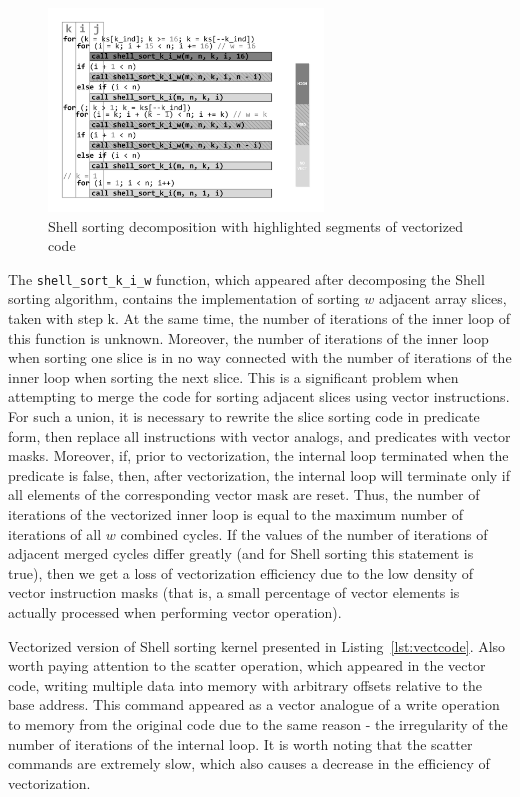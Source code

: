 \documentclass[
11pt,%
tightenlines,%
twoside,%
onecolumn,%
nofloats,%
nobibnotes,%
nofootinbib,%
superscriptaddress,%
noshowpacs,%
centertags]%
{revtex4}
\begin{document}
\begin{figure}[h]
\setcaptionmargin{5mm}
\onelinecaptionsfalse
\includegraphics[width=0.65\textwidth]{pics/pic_decomposition.pdf}
\caption{Shell sorting decomposition with highlighted segments of vectorized code}\label{pic:decompos}
\end{figure}

The \texttt{shell\_sort\_k\_i\_w} function, which appeared after decomposing the Shell sorting algorithm, contains the implementation of sorting $ w $ adjacent array slices, taken with step k. 
At the same time, the number of iterations of the inner loop of this function is unknown.
Moreover, the number of iterations of the inner loop when sorting one slice is in no way connected with the number of iterations of the inner loop when sorting the next slice.
This is a significant problem when attempting to merge the code for sorting adjacent slices using vector instructions.
For such a union, it is necessary to rewrite the slice sorting code in predicate form, then replace all instructions with vector analogs, and predicates with vector masks.
Moreover, if, prior to vectorization, the internal loop terminated when the predicate is false, then, after vectorization, the internal loop will terminate only if all elements of the corresponding vector mask are reset.
Thus, the number of iterations of the vectorized inner loop is equal to the maximum number of iterations of all $ w $ combined cycles.
If the values of the number of iterations of adjacent merged cycles differ greatly (and for Shell sorting this statement is true), then we get a loss of vectorization efficiency due to the low density of vector instruction masks (that is, a small percentage of vector elements is actually processed when performing vector operation).

Vectorized version of Shell sorting kernel presented in Listing~\ref{lst:vectcode}.
Also worth paying attention to the scatter operation, which appeared in the vector code, writing multiple data into memory with arbitrary offsets relative to the base address.
This command appeared as a vector analogue of a write operation to memory from the original code due to the same reason - the irregularity of the number of iterations of the internal loop.
It is worth noting that the scatter commands are extremely slow, which also causes a decrease in the efficiency of vectorization.
\end{document}
